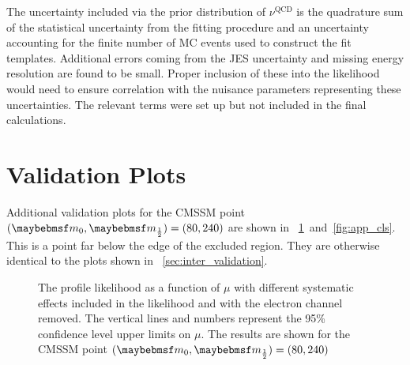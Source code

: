 The uncertainty included via the prior distribution of $\nu^{\textrm{QCD}}$ is
the quadrature sum of the statistical uncertainty from the fitting procedure and an
uncertainty accounting for the finite number of \ac{MC} events used to construct
the fit templates. Additional errors coming from the \ac{JES} uncertainty and
missing energy resolution are found to be small. Proper inclusion of these into
the likelihood would need to ensure correlation with the nuisance parameters
representing these uncertainties. The relevant terms were set up but not
included in the final calculations.

\section{Validation Plots}
\label{sec:app_inter_validation}
Additional validation plots for the \ac{CMSSM} point $(\Mzero, \Mhalf) = (80,
240)$ are shown in \figs~\ref{fig:app_pl}~and~\ref{fig:app_cls}. This is a
point far below the edge of the excluded region. They are otherwise identical to
the plots shown in \sec~\ref{sec:inter_validation}.


\begin{figure}[h!]
\centering
{}\quad
{}
\caption[The profile likelihood as a function of $\mu$]{The profile
  likelihood as a function of $\mu$ 
  with different systematic effects included in the likelihood and
   with the electron channel
  removed. The vertical lines and numbers represent the 95\%
  confidence level upper limits on $\mu$. The results are shown for
  the \ac{CMSSM} point $(\Mzero, \Mhalf) = (80, 240)$}
\label{fig:app_pl}
\end{figure}


